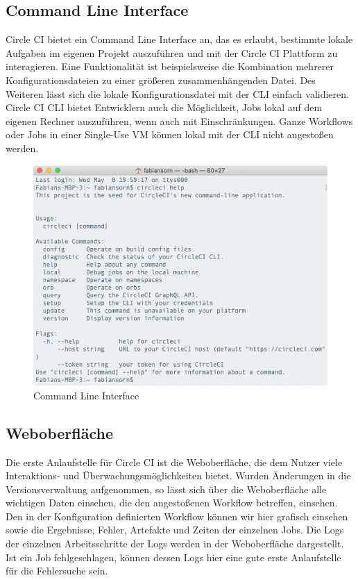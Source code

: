 \documentclass[11pt]{article}
\begin{document}
\subsection{Command Line Interface}
Circle CI bietet ein Command Line Interface an, das es erlaubt, bestimmte lokale Aufgaben im eigenen Projekt auszuführen und mit der Circle CI Plattform zu interagieren. Eine Funktionalität ist beispielsweise die Kombination mehrerer Konfigurationsdateien zu einer größeren zusammenhängenden Datei. Des Weiteren lässt sich die lokale Konfigurationsdatei mit der CLI einfach validieren. Circle CI CLI bietet Entwicklern auch die Möglichkeit, Jobs lokal auf dem eigenen Rechner auszuführen, wenn auch mit Einschränkungen. Ganze Workflows oder Jobs in einer Single-Use VM können lokal mit der CLI nicht angestoßen werden.

\begin{figure}[H]
	\centering
  	\includegraphics[width=0.7\linewidth]{../Images/CLI}
  	\caption{Command Line Interface}
  	\label{fig:cli}
\end{figure}

\subsection{Weboberfläche}
Die erste Anlaufstelle für Circle CI ist die Weboberfläche, die dem Nutzer viele Interaktions- und Überwachungsmöglichkeiten bietet. Wurden Änderungen in die Versionsverwaltung aufgenommen, so lässt sich über die Weboberfläche alle wichtigen Daten einsehen, die den angestoßenen Workflow betreffen, einsehen. Den in der Konfiguration definierten Workflow können wir hier grafisch einsehen sowie die Ergebnisse, Fehler, Artefakte und Zeiten der einzelnen Jobs. Die Logs der einzelnen Arbeitsschritte der Logs werden in der Weboberfläche dargestellt. Ist ein Job fehlgeschlagen, können dessen Logs hier eine gute erste Anlaufstelle für die Fehlersuche sein.
\end{document}
